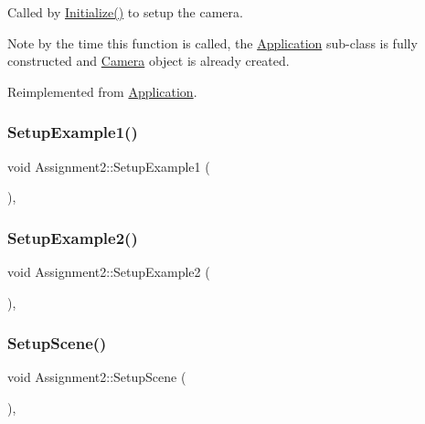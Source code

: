 Called by \hyperlink{class_application_a17cf1ea4552d26a1c20f7d98d793d41d}{Initialize()} to setup the camera. 

Note by the time this function is called, the \hyperlink{class_application}{Application} sub-\/class is fully constructed and \hyperlink{class_camera}{Camera} object is already created. 

Reimplemented from \hyperlink{class_application_a2eb61ca027f223a5c5ad1bf982481193}{Application}.

\hypertarget{class_assignment2_a2f42c6da59d8b5ba5dc4796d8bd13d30}{}\label{class_assignment2_a2f42c6da59d8b5ba5dc4796d8bd13d30} 
\subsubsection{\texorpdfstring{Setup\+Example1()}{SetupExample1()}}
{\footnotesize\ttfamily void Assignment2\+::\+Setup\+Example1 (\begin{DoxyParamCaption}{ }\end{DoxyParamCaption})\hspace{0.3cm}{\ttfamily [private]}, {\ttfamily [virtual]}}

\hypertarget{class_assignment2_aa26c3cd3e97be7ef88aae8d26d4af6bc}{}\label{class_assignment2_aa26c3cd3e97be7ef88aae8d26d4af6bc} 
\subsubsection{\texorpdfstring{Setup\+Example2()}{SetupExample2()}}
{\footnotesize\ttfamily void Assignment2\+::\+Setup\+Example2 (\begin{DoxyParamCaption}{ }\end{DoxyParamCaption})\hspace{0.3cm}{\ttfamily [private]}, {\ttfamily [virtual]}}

\hypertarget{class_assignment2_aa4f8ccd09a7accbdf093394c6ee4f63f}{}\label{class_assignment2_aa4f8ccd09a7accbdf093394c6ee4f63f} 
\subsubsection{\texorpdfstring{Setup\+Scene()}{SetupScene()}}
{\footnotesize\ttfamily void Assignment2\+::\+Setup\+Scene (\begin{DoxyParamCaption}{ }\end{DoxyParamCaption})\hspace{0.3cm}{\ttfamily [private]}, {\ttfamily [virtual]}}



